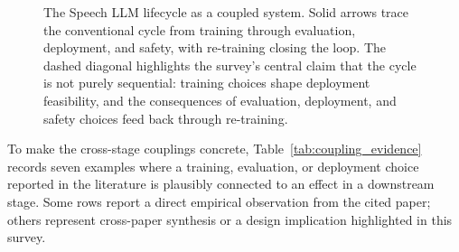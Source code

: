 \begin{figure}[!t]
\caption{The Speech LLM lifecycle as a coupled system. Solid arrows
trace the conventional cycle from training through evaluation,
deployment, and safety, with re-training closing the loop. The dashed
diagonal highlights the survey's central claim that the cycle is not
purely sequential: training choices shape deployment feasibility,
and the consequences of evaluation, deployment, and safety choices
feed back through re-training.}
\label{fig:lifecycle}
\end{figure}

To make the cross-stage couplings concrete,
Table~\ref{tab:coupling_evidence} records seven examples where a
training, evaluation, or deployment choice reported in the literature is
plausibly connected to an effect in a downstream stage. Some rows
report a direct empirical observation from the cited paper; others
represent cross-paper synthesis or a design implication highlighted in
this survey.

